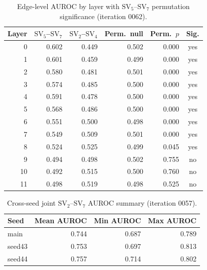 \documentclass[12pt]{article}
\newcommand{\SV}[1]{\mathrm{SV}_{#1}}
\begin{document}
\begin{table}[!ht]
\centering
\caption{Edge-level AUROC by layer with $\SV{5}$--$\SV{7}$ permutation significance (iteration 0062).}
\label{tab:edge_auroc_full}
\begin{tabular}{rrrrrc}
\toprule
Layer & $\SV{5}$--$\SV{7}$ & $\SV{2}$--$\SV{4}$ & Perm.\ null & Perm.\ $p$ & Sig. \\
\midrule
0 & 0.602 & 0.449 & 0.502 & 0.000 & yes \\
1 & 0.601 & 0.459 & 0.499 & 0.000 & yes \\
2 & 0.580 & 0.481 & 0.501 & 0.000 & yes \\
3 & 0.574 & 0.485 & 0.500 & 0.000 & yes \\
4 & 0.591 & 0.478 & 0.500 & 0.000 & yes \\
5 & 0.568 & 0.486 & 0.500 & 0.000 & yes \\
6 & 0.551 & 0.500 & 0.498 & 0.000 & yes \\
7 & 0.549 & 0.509 & 0.501 & 0.000 & yes \\
8 & 0.524 & 0.525 & 0.499 & 0.045 & yes \\
9 & 0.494 & 0.498 & 0.502 & 0.755 & no \\
10 & 0.492 & 0.515 & 0.500 & 0.760 & no \\
11 & 0.498 & 0.519 & 0.498 & 0.525 & no \\
\bottomrule
\end{tabular}
\end{table}

\begin{table}[!ht]
\centering
\caption{Cross-seed joint $\SV{2}$--$\SV{7}$ AUROC summary (iteration 0057).}
\label{tab:cross_seed}
\begin{tabular}{lrrr}
\toprule
Seed & Mean AUROC & Min AUROC & Max AUROC \\
\midrule
main & 0.744 & 0.687 & 0.789 \\
seed43 & 0.753 & 0.697 & 0.813 \\
seed44 & 0.757 & 0.714 & 0.802 \\
\bottomrule
\end{tabular}
\end{table}
\end{document}
